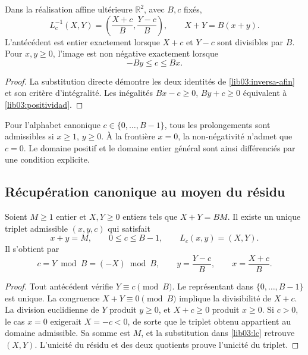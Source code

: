 \begin{proposition}
\label{lib03:prop-inversa}
Dans la réalisation affine ultérieure \(\mathbb R^2\), avec \(B,c\) fixés,
\begin{equation}
 L_c^{-1}(X,Y)=\left(\frac{X+c}{B},\frac{Y-c}{B}\right),\qquad
 X+Y=B(x+y).
 \label{lib03:inversa-afin}
\end{equation}
L’antécédent est entier exactement lorsque \(X+c\) et \(Y-c\) sont
divisibles par \(B\). Pour \(x,y\geq0\), l’image est non négative
exactement lorsque
\begin{equation}
 -By\leq c\leq Bx.
 \label{lib03:positividad}
\end{equation}
\end{proposition}

\begin{proof}
La substitution directe démontre les deux identités de
\eqref{lib03:inversa-afin} et son critère d’intégralité. Les
inégalités \(Bx-c\geq0\), \(By+c\geq0\) équivalent à
\eqref{lib03:positividad}.
\end{proof}

Pour l'alphabet canonique \(c\in\{0,\ldots,B-1\}\), tous les prolongements sont admissibles si \(x\geq1\), \(y\geq0\). À la frontière \(x=0\), la non-négativité n'admet que \(c=0\). Le domaine positif et le domaine entier général sont ainsi différenciés par une condition explicite.

\subsection{Récupération canonique au moyen du résidu}
\label{lib03:residuo}

\begin{theorem}
\label{lib03:teo-residuo}
Soient \(M\geq1\) entier et \(X,Y\geq0\) entiers tels que
\(X+Y=BM\). Il existe un unique triplet admissible \((x,y,c)\) qui satisfait
\[
 x+y=M,\qquad 0\leq c\leq B-1,\qquad L_c(x,y)=(X,Y).
\]
Il s’obtient par
\begin{equation}
 c=Y\bmod B=(-X)\bmod B,\qquad
 y=\frac{Y-c}{B},\qquad x=\frac{X+c}{B}.
 \label{lib03:residuo-inversor}
\end{equation}
\end{theorem}

\begin{proof}
Tout antécédent vérifie \(Y\equiv c\pmod B\). Le représentant dans
\(\{0,\ldots,B-1\}\) est unique. La congruence \(X+Y\equiv0\pmod B\)
implique la divisibilité de \(X+c\). La division euclidienne de \(Y\)
produit \(y\geq0\), et \(X+c\geq0\) produit \(x\geq0\). Si
\(c>0\), le cas \(x=0\) exigerait \(X=-c<0\), de sorte que le
triplet obtenu appartient au domaine admissible. Sa somme est \(M\), et
la substitution dans \eqref{lib03:lc} retrouve \((X,Y)\). L’unicité
du résidu et des deux quotients prouve l’unicité du triplet.
\end{proof}

